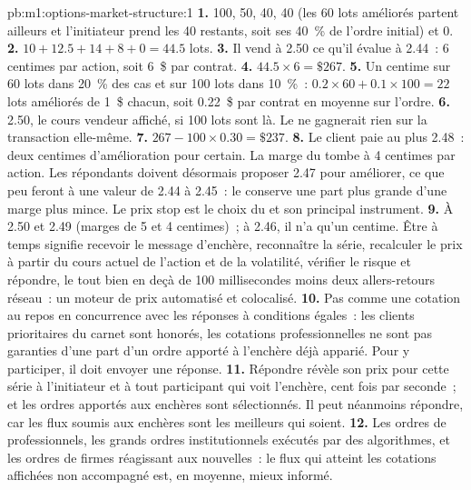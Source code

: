 \begin{solution}{pb:m1:options-market-structure:1}
\textbf{1.} 100, 50, 40, 40 (les 60 lots améliorés partent ailleurs et l'initiateur
prend les 40 restants, soit ses 40~\% de l'ordre initial) et 0.
\textbf{2.} $10 + 12.5 + 14 + 8 + 0 = 44.5$ lots.
\textbf{3.} Il vend à 2.50 ce qu'il évalue à 2.44~: 6 centimes par action, soit
6~\$ par contrat.
\textbf{4.} $44.5 \times 6 = \$267$.
\textbf{5.} Un centime sur 60 lots dans 20~\% des cas et sur 100 lots dans 10~\%~:
$0.2 \times 60 + 0.1 \times 100 = 22$ lots améliorés de 1~\$ chacun, soit 0.22~\$ par
contrat en moyenne sur l'ordre.
\textbf{6.} 2.50, le cours vendeur affiché, si 100 lots sont là. Le 
ne gagnerait rien sur la transaction elle-même.
\textbf{7.} $267 - 100 \times 0.30 = \$237$.
\textbf{8.} Le client paie au plus 2.48~: deux centimes d'amélioration pour
certain. La marge du  tombe à 4 centimes par action. Les répondants doivent désormais
proposer 2.47 pour améliorer, ce que peu feront à une valeur de 2.44 à 2.45~: le
 conserve une part plus grande d'une marge plus mince. Le prix stop est le
choix du  et son principal instrument.
\textbf{9.} À 2.50 et 2.49 (marges de 5 et 4 centimes)~; à 2.46, il n'a qu'un centime.
Être à temps signifie recevoir le message d'enchère, reconnaître la série,
recalculer le prix à partir du cours actuel de l'action et de la volatilité, vérifier le risque et
répondre, le tout bien en deçà de 100 millisecondes moins deux allers-retours réseau~: un
moteur de prix automatisé et colocalisé.
\textbf{10.} Pas comme une cotation au repos en concurrence avec les réponses à conditions égales~:
les clients prioritaires du carnet sont honorés, les cotations professionnelles ne sont pas
garanties d'une part d'un ordre apporté à l'enchère déjà
apparié. Pour y participer, il doit envoyer une réponse.
\textbf{11.} Répondre révèle son prix pour cette série à l'initiateur
et à tout participant qui voit l'enchère, cent fois par seconde~; et
les ordres apportés aux enchères sont sélectionnés. Il peut néanmoins répondre, car
les flux soumis aux enchères sont les meilleurs qui soient.
\textbf{12.} Les ordres de professionnels, les grands ordres institutionnels exécutés par
des algorithmes, et les ordres de firmes réagissant aux nouvelles~: le flux qui atteint
les cotations affichées non accompagné est, en moyenne, mieux informé.

\end{solution}
